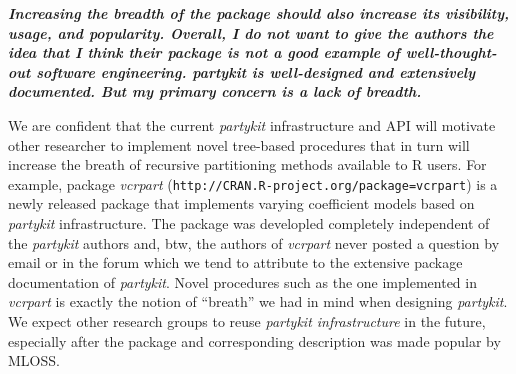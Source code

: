 \documentclass{article}
\begin{document}
\textbf{\textit{%
Increasing the breadth of the package should also increase its visibility,
usage, and popularity.
Overall, I do not want to give the authors the idea that I think their
package is not a good example of well-thought-out software engineering. 
partykit is well-designed and extensively documented.  But my primary
concern is a lack of breadth.
}}

\smallskip

We are confident that the current \emph{partykit} infrastructure and API
will motivate other researcher to implement novel tree-based procedures that
in turn will increase the breath of recursive partitioning methods available
to R users.  For example, package \emph{vcrpart}
(\texttt{http://CRAN.R-project.org/package=vcrpart}) is a newly released
package that implements varying coefficient models based on \emph{partykit}
infrastructure.  The package was developled completely independent of the
\emph{partykit} authors and, btw, the authors of \emph{vcrpart} never posted
a question by email or in the forum which we tend to attribute to the
extensive package documentation of \emph{partykit}.  Novel procedures such
as the one implemented in \emph{vcrpart} is exactly the notion of ``breath''
we had in mind when designing \emph{partykit}.  We expect other research
groups to reuse \emph{partykit infrastructure} in the future, especially
after the package and corresponding description was made popular by MLOSS.



\end{document}
